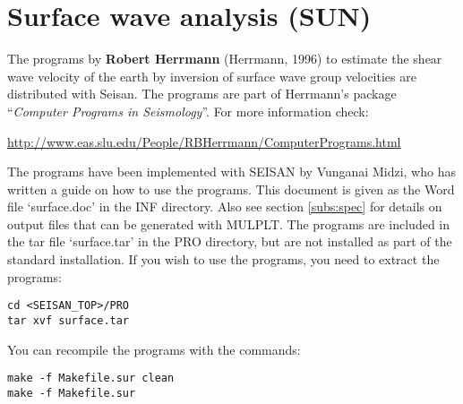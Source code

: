 
\section{Surface wave analysis (SUN)} 

The programs by \textbf{Robert Herrmann} (Herrmann, 1996) to estimate the shear 
wave velocity of the earth by inversion of surface wave
group velocities
are distributed with Seisan. The programs are part of Herrmann's package
``\textit{Computer Programs in Seismology}''. For more information check: 

\url{http://www.eas.slu.edu/People/RBHerrmann/ComputerPrograms.html}  

The programs have been implemented with SEISAN by Vunganai Midzi, who has written a guide on how to use the programs. This document is given as the Word file `surface.doc' in the INF directory. Also see section \ref{subs:spec} for details on output files that can be generated with MULPLT. The programs are included in the tar file `surface.tar' in the PRO directory, but are not installed as part of the standard installation. If you wish to use the programs, you need to extract the programs: 

\begin{verbatim}
cd <SEISAN_TOP>/PRO
tar xvf surface.tar 
\end{verbatim}

You can recompile the programs with the commands: 

\begin{verbatim}
make -f Makefile.sur clean
make -f Makefile.sur 
\end{verbatim}



